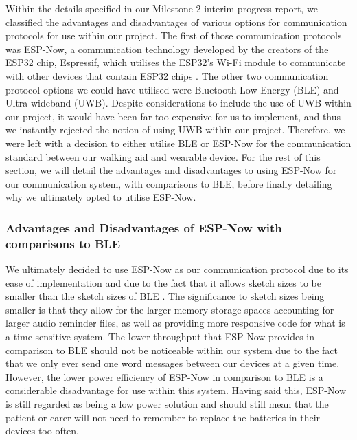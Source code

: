             Within the details specified in our Milestone 2 interim progress report, we classified the advantages and disadvantages of various options for communication protocols for use within our project. The first of those communication protocols was ESP-Now, a communication technology developed by the creators of the ESP32 chip, Espressif, which utilises the ESP32's Wi-Fi module to communicate with other devices that contain ESP32 chips \cite{esp-now_overview}. The other two communication protocol options we could have utilised were Bluetooth Low Energy (BLE) and Ultra-wideband (UWB). Despite considerations to include the use of UWB within our project, it would have been far too expensive for us to implement, and thus we instantly rejected the notion of using UWB within our project. Therefore, we were left with a decision to either utilise BLE or ESP-Now for the communication standard between our walking aid and wearable device. For the rest of this section, we will detail the advantages and disadvantages to using ESP-Now for our communication system, with comparisons to BLE, before finally detailing why we ultimately opted to utilise ESP-Now.

            \newpage
            \subsubsection{Advantages and Disadvantages of ESP-Now with comparisons to BLE}
            \label{subsubsec:esp_now_advantages_disadvantages}

                \vspace{2em}
                
                \vspace{5em}

                We ultimately decided to use ESP-Now as our communication protocol due to its ease of implementation and due to the fact that it allows sketch sizes to be smaller \cite{random_nerd_tutorials} than the sketch sizes of BLE \cite{kolban_2018}. The significance to sketch sizes being smaller is that they allow for the larger memory storage spaces accounting for larger audio reminder files, as well as providing more responsive code for what is a time sensitive system. The lower throughput that ESP-Now provides in comparison to BLE should not be noticeable within our system due to the fact that we only ever send one word messages between our devices at a given time. However, the lower power efficiency of ESP-Now in comparison to BLE is a considerable disadvantage for use within this system. Having said this, ESP-Now is still regarded as being a low power solution and should still mean that the patient or carer will not need to remember to replace the batteries in their devices too often.


